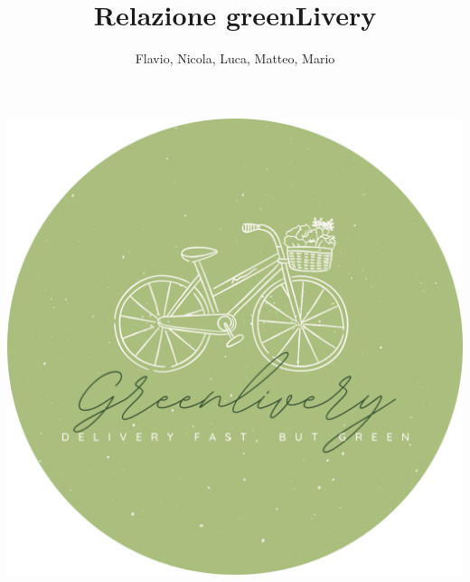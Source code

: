 \documentclass{article}
\begin{document}
\begin{center}
\includegraphics[width=\textwidth]{Data/logocircle.png}
\title{Relazione greenLivery}
\author{Flavio, Nicola, Luca, Matteo, Mario}
\end{center}
\renewcommand{\contentsname}{Indice}

\maketitle
\tableofcontents
\end{document}
